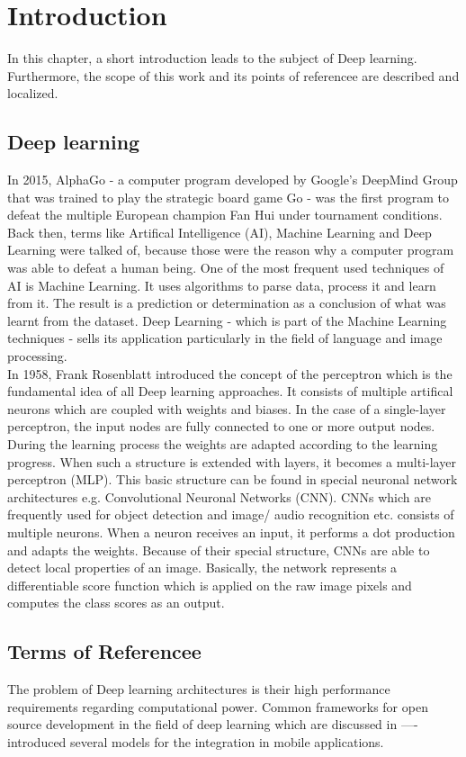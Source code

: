 \section{Introduction}
In this chapter, a short introduction leads to the subject of Deep learning. Furthermore, the scope of this work and its points of referencee are described and localized. 
	\subsection{Deep learning}
		
In 2015, AlphaGo - a computer program developed by Google's DeepMind Group that was trained to play the strategic board game Go - was the first program to defeat the multiple European champion Fan Hui under tournament conditions. Back then, terms like Artifical Intelligence (AI), Machine Learning and Deep Learning were talked of, because those were the reason why a computer program was able to defeat a human being. One of the most frequent used techniques of AI is Machine Learning. It uses algorithms to parse data, process it and learn from it. The result is a prediction or determination as a conclusion of what was learnt from the dataset. Deep Learning - which is part of the Machine Learning techniques - sells its application particularly in the field of language and image processing. \\

In 1958, Frank Rosenblatt introduced the concept of the perceptron which is the fundamental idea of all Deep learning approaches. It consists of multiple artifical neurons which are coupled with weights and biases. In the case of a single-layer perceptron, the input nodes are fully connected to one or more output nodes. During the learning process the weights are adapted according to the learning progress. When such a structure is extended with layers, it becomes a multi-layer perceptron (MLP). This basic structure can be found in special neuronal network architectures e.g. Convolutional Neuronal Networks (CNN). CNNs which are frequently used for object detection and image/ audio recognition etc. consists of multiple neurons. When a neuron receives an input, it performs a dot production and adapts the weights. Because of their special structure, CNNs are able to detect local properties of an image. Basically, the network represents a differentiable score function which is applied on the raw image pixels and computes the class scores as an output.
 
	\subsection{Terms of Referencee}
The problem of Deep learning architectures is their high performance requirements regarding computational power. Common frameworks for open source development in the field of deep learning which are discussed in ---- introduced several models for the integration in mobile applications. \\

